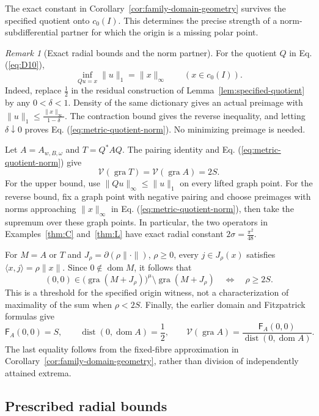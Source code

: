 \documentclass[11pt]{article}
\newcommand{\gra}{\operatorname{gra}}
\newcommand{\dom}{\operatorname{dom}}
\newcommand{\pair}[2]{\langle #1,#2\rangle}
\theoremstyle{definition}
\theoremstyle{remark}
\newtheorem{remark}{Remark}
\newcommand{\dist}{\operatorname{dist}}
\begin{document}
The exact constant in Corollary~\ref{cor:family-domain-geometry} survives the specified quotient onto $c_0(I)$. This determines the precise strength of a norm-subdifferential partner for which the origin is a missing polar point.

\begin{remark}[Exact radial bounds and the norm partner]
\label{rem:sharp-radial-transfer}
For the quotient $Q$ in Eq. (\ref{eq:D10}),
\begin{equation}
\inf_{Qu=x}\|u\|_1=\|x\|_\infty\qquad(x\in c_0(I)).
\label{eq:metric-quotient-norm}
\end{equation}
Indeed, replace $\frac12$ in the residual construction of Lemma~\ref{lem:specified-quotient} by any $0<\delta<1$. Density of the same dictionary gives an actual preimage with $\|u\|_1\le\frac{\|x\|_\infty}{1-\delta}$. The contraction bound gives the reverse inequality, and letting $\delta\downarrow0$ proves Eq. (\ref{eq:metric-quotient-norm}). No minimizing preimage is needed.

Let $A=A_{w,B,\omega}$ and $T=Q^*AQ$. The pairing identity and Eq. (\ref{eq:metric-quotient-norm}) give
\[
\mathcal V(\gra T)=\mathcal V(\gra A)=2S.
\]
For the upper bound, use $\|Qu\|_\infty\le\|u\|_1$ on every lifted graph point. For the reverse bound, fix a graph point with negative pairing and choose preimages with norms approaching $\|x\|_\infty$ in Eq. (\ref{eq:metric-quotient-norm}), then take the supremum over these graph points. In particular, the two operators in Examples~\ref{thm:C} and~\ref{thm:L} have exact radial constant $2\sigma=\frac{\pi^2}{48}$.

For $M=A$ or $T$ and $J_\rho=\partial(\rho\|\cdot\|)$, $\rho\ge0$, every $j\in J_\rho(x)$ satisfies $\pair{x}{j}=\rho\|x\|$. Since $0\notin\dom M$, it follows that
\[
(0,0)\in\bigl(\gra(M+J_\rho)\bigr)^\mu\setminus\gra(M+J_\rho)
\quad\Longleftrightarrow\quad \rho\ge2S.
\]
This is a threshold for the specified origin witness, not a characterization of maximality of the sum when $\rho<2S$. Finally, the earlier domain and Fitzpatrick formulas give
\[
\mathsf F_A(0,0)=S,\qquad
\dist(0,\dom A)=\frac12,\qquad
\mathcal V(\gra A)=\frac{\mathsf F_A(0,0)}{\dist(0,\dom A)}.
\]
The last equality follows from the fixed-fibre approximation in Corollary~\ref{cor:family-domain-geometry}, rather than division of independently attained extrema.
\end{remark}


\subsection{Prescribed radial bounds}
\label{subsec:appendix-radial}
\end{document}
